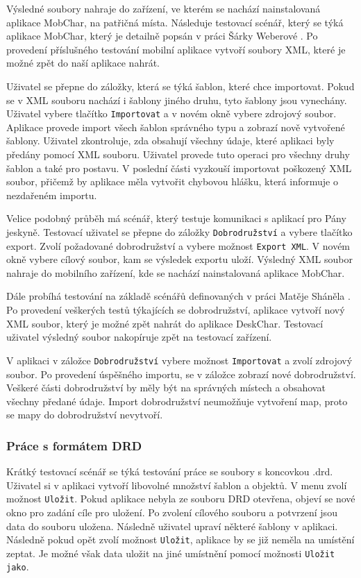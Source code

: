 \documentclass[thesis=B,czech]{resources/FITthesis}[2012/06/26]
\begin{document}
Výsledné soubory nahraje do zařízení, ve kterém se nachází nainstalovaná aplikace MobChar, na patřičná místa. Následuje testovací scénář, který se týká aplikace MobChar, který je detailně popsán v práci Šárky Weberové \cite{Weberova_2017}. Po provedení příslušného testování mobilní aplikace vytvoří soubory XML, které je možné zpět do naší aplikace nahrát. \par

Uživatel se přepne do záložky, která se týká šablon, které chce importovat. Pokud se v XML souboru nachází i šablony jiného druhu, tyto šablony jsou vynechány. Uživatel vybere tlačítko \texttt{Importovat} a v novém okně vybere zdrojový soubor. Aplikace provede import všech šablon správného typu a zobrazí nově vytvořené šablony. Uživatel zkontroluje, zda obsahují všechny údaje, které aplikaci byly předány pomocí XML souboru. Uživatel provede tuto operaci pro všechny druhy šablon a také pro postavu. V poslední části vyzkouší importovat poškozený XML soubor, přičemž by aplikace měla vytvořit chybovou hlášku, která informuje o nezdařeném importu. \par

Velice podobný průběh má scénář, který testuje komunikaci s aplikací pro Pány jeskyně. Testovací uživatel se přepne do záložky \texttt{Dobrodružství} a vybere tlačítko export. Zvolí požadované dobrodružství a vybere možnost \texttt{Export XML}. V novém okně vybere cílový soubor, kam se výsledek exportu uloží. Výsledný XML soubor nahraje do mobilního zařízení, kde se nachází nainstalovaná aplikace MobChar. \par

Dále probíhá testování na základě scénářů definovaných v práci Matěje Sháněla \cite{Shanel_2017}. Po provedení veškerých testů týkajících se dobrodružství, aplikace vytvoří nový XML soubor, který je možné zpět nahrát do aplikace DeskChar. Testovací uživatel výsledný soubor nakopíruje zpět na testovací zařízení. \par

V aplikaci v záložce \texttt{Dobrodružství} vybere možnost \texttt{Importovat} a zvolí zdrojový soubor. Po provedení úspěšného importu, se v záložce zobrazí nové dobrodružství. Veškeré části dobrodružství by měly být na správných místech a obsahovat všechny předané údaje. Import dobrodružství neumožňuje vytvoření map, proto se mapy do dobrodružství nevytvoří. 

\subsubsection{Práce s formátem DRD}
Krátký testovací scénář se týká testování práce se soubory s koncovkou .drd. Uživatel si v aplikaci vytvoří libovolné množství šablon a objektů. V menu zvolí možnost \texttt{Uložit}. Pokud aplikace nebyla ze souboru DRD otevřena, objeví se nové okno pro zadání cíle pro uložení. Po zvolení cílového souboru a potvrzení jsou data do souboru uložena. Následně uživatel upraví některé šablony v aplikaci. Následně pokud opět zvolí možnost \texttt{Uložit}, aplikace by se již neměla na umístění zeptat. Je možné však data uložit na jiné umístnění pomocí možnosti \texttt{Uložit jako}. \par
\end{document}
